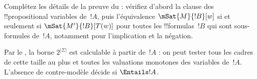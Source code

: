 \documentclass[../../../include/open-logic-section]{subfiles}
\begin{document}
\begin{prob}
Complétez les détails de la preuve du
 : vérifiez d'abord la clause
des !!{propositional variable}s de~$!A$, puis l'équivalence
$\mSat{M}{!B}[w]$ si et seulement si
$\mSat{M'}{!B}[T(w)]$ pour toutes les !!{formula}s~$!B$ qui sont
sous-formules de~$!A$,
notamment pour l'implication et la négation.
\end{prob}

Par le , la borne $2^{|\Sigma|}$ est calculable
à partir de~$!A$ : on peut
tester tous les cadres de cette taille au plus et toutes les
valuations monotones des variables de~$!A$. L'absence de
contre-modèle décide si $\Entails !A$.
\end{document}
